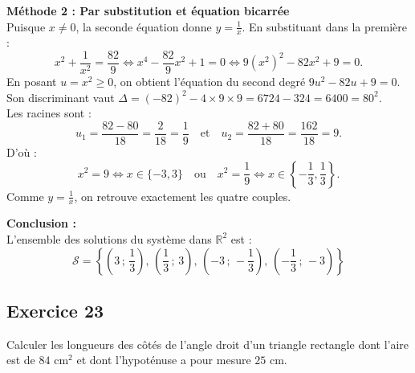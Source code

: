 \documentclass[11pt,a4paper]{article}
\begin{document}
\begin{correctionbox}
\textbf{Méthode 2 : Par substitution et équation bicarrée}\\
Puisque $x \ne 0$, la seconde équation donne $y = \frac{1}{x}$. En substituant dans la première :
\[
x^2 + \frac{1}{x^2} = \frac{82}{9} \iff x^4 - \frac{82}{9}x^2 + 1 = 0 \iff 9(x^2)^2 - 82x^2 + 9 = 0.
\]
En posant $u = x^2 \ge 0$, on obtient l'équation du second degré $9u^2 - 82u + 9 = 0$.\\
Son discriminant vaut $\Delta = (-82)^2 - 4 \times 9 \times 9 = 6724 - 324 = 6400 = 80^2$.\\
Les racines sont :
\[
u_1 = \frac{82 - 80}{18} = \frac{2}{18} = \frac{1}{9} \quad \text{et} \quad u_2 = \frac{82 + 80}{18} = \frac{162}{18} = 9.
\]
D'où :
\[
x^2 = 9 \iff x \in \{-3, 3\} \quad \text{ou} \quad x^2 = \frac{1}{9} \iff x \in \left\{ -\frac{1}{3}, \frac{1}{3} \right\}.
\]
Comme $y = \frac{1}{x}$, on retrouve exactement les quatre couples.

\textbf{Conclusion :}\\
L'ensemble des solutions du système dans $\mathbb{R}^2$ est :
\[
\boxed{\mathcal{S} = \left\{ \left(3\,;\,\frac{1}{3}\right),\, \left(\frac{1}{3}\,;\,3\right),\, \left(-3\,;\,-\frac{1}{3}\right),\, \left(-\frac{1}{3}\,;\,-3\right) \right\}}
\]
\end{correctionbox}

\subsection*{Exercice 23}
Calculer les longueurs des côtés de l'angle droit d'un triangle rectangle dont l'aire est de $84\text{ cm}^2$ et dont l'hypoténuse a pour mesure $25\text{ cm}$.
\end{document}
